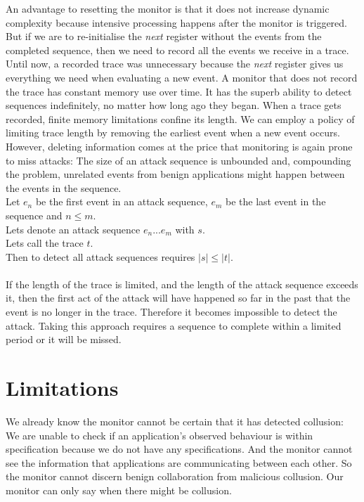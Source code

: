 An advantage to resetting the monitor is that it does not increase dynamic complexity because intensive processing happens after the monitor is triggered.  But if we are to re-initialise the \textit{next} register without the events from the completed sequence, then we need to record all the events we receive in a trace.  Until now, a recorded trace was unnecessary because the \textit{next} register gives us everything we need when evaluating a new event.  A monitor that does not record the trace has constant memory use over time.  It has the superb ability to detect sequences indefinitely, no matter how long ago they began.  When a trace gets recorded, finite memory limitations confine its length.  We can employ a policy of limiting trace length by removing the earliest event when a new event occurs.  However, deleting information comes at the price that monitoring is again prone to miss attacks: The size of an attack sequence is unbounded and, compounding the problem, unrelated events from benign applications might happen between the events in the sequence.\\

\indent Let $e_n$ be the first event in an attack sequence, $e_m$ be the last event in the sequence and $n \leq m$.\\
\indent Lets denote an attack sequence $e_n...e_m$ with $s$.\\
\indent Lets call the trace $t$.\\
\indent Then to detect all attack sequences requires $| s | \leq | t |$.\\
\\
If the length of the trace is limited, and the length of the attack sequence exceeds it, then the first act of the attack will have happened so far in the past that the event is no longer in the trace.  Therefore it becomes impossible to detect the attack.  Taking this approach requires a sequence to complete within a limited period or it will be missed.

\section{Limitations}

We already know the monitor cannot be certain that it has detected collusion: We are unable to check if an application's observed behaviour is within specification because we do not have any specifications.  And the monitor cannot see the information that applications are communicating between each other.  So the monitor cannot discern benign collaboration from malicious collusion.  Our monitor can only say when there might be collusion.

